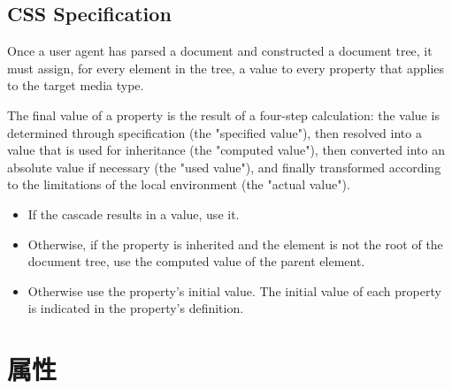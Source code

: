 \subsection{CSS Specification}

Once a user agent has parsed a document and constructed a document tree, it must assign, for every element in the tree, a value to every property that applies to the target media type.

The final value of a property is the result of a four-step calculation: the value is determined through specification (the "specified value"), then resolved into a value that is used for inheritance (the "computed value"), then converted into an absolute value if necessary (the "used value"), and finally transformed according to the limitations of the local environment (the "actual value").

\begin{itemize}
\item If the cascade results in a value, use it.
\item Otherwise, if the property is inherited and the element is not the root of the document tree, use the computed value of the parent element. 
\item Otherwise use the property's initial value. The initial value of each property is indicated in the property's definition. 
\end{itemize}






\section{属性}

